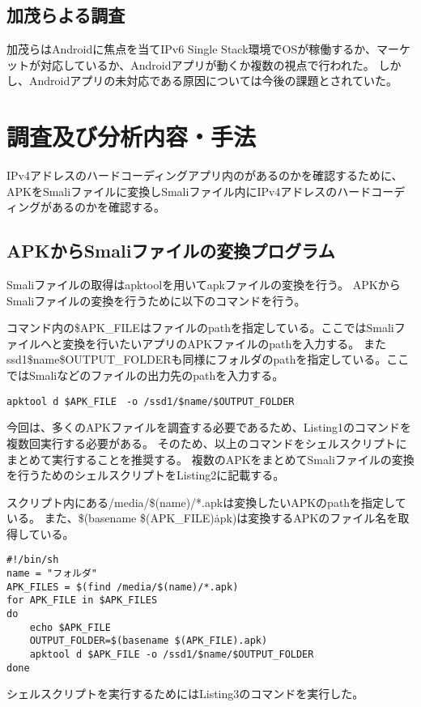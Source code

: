 \documentclass[a4j]{jarticle}
\begin{document}
\subsection{加茂らよる調査}
加茂らはAndroidに焦点を当てIPv6 Single Stack環境でOSが稼働するか、マーケットが対応しているか、Androidアプリが動くか複数の視点で行われた。
しかし、Androidアプリの未対応である原因については今後の課題とされていた\cite{four}。

\newpage
\section{調査及び分析内容・手法}
IPv4アドレスのハードコーディングアプリ内のがあるのかを確認するために、APKをSmaliファイルに変換しSmaliファイル内にIPv4アドレスのハードコーディングがあるのかを確認する。
\subsection{APKからSmaliファイルの変換プログラム}
Smaliファイルの取得はapktoolを用いてapkファイルの変換を行う。
APKからSmaliファイルの変換を行うために以下のコマンドを行う。

コマンド内の\$APK\_FILEはファイルのpathを指定している。ここではSmaliファイルへと変換を行いたいアプリのAPKファイルのpathを入力する。
また\/ssd1\/\$name\/\$OUTPUT\_FOLDERも同様にフォルダのpathを指定している。ここではSmaliなどのファイルの出力先のpathを入力する。

\begin{lstlisting}[caption=APKからSmaliファイルの変換のコマンド]
	apktool d $APK_FILE　-o /ssd1/$name/$OUTPUT_FOLDER
\end{lstlisting}

今回は、多くのAPKファイルを調査する必要であるため、Listing1のコマンドを複数回実行する必要がある。
そのため、以上のコマンドをシェルスクリプトにまとめて実行することを推奨する。
複数のAPKをまとめてSmaliファイルの変換を行うためのシェルスクリプトをListing2に記載する。

スクリプト内にある/media/\$(name)/*.apkは変換したいAPKのpathを指定している。
また、\$(basename \$(APK\_FILE)\.apk)は変換するAPKのファイル名を取得している。
\begin{lstlisting}[caption=複数のAPKからSmaliファイルの変換を行うシェルスクリプト]
#!/bin/sh
name = "フォルダ"
APK_FILES = $(find /media/$(name)/*.apk)
for APK_FILE in $APK_FILES
do
	echo $APK_FILE
	OUTPUT_FOLDER=$(basename $(APK_FILE).apk)
	apktool d $APK_FILE -o /ssd1/$name/$OUTPUT_FOLDER
done
\end{lstlisting}
シェルスクリプトを実行するためにはListing3のコマンドを実行した。
\end{document}
